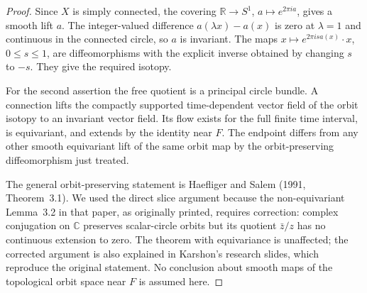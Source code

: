 \begin{proof}
Since \(X\) is simply connected, the covering
\(\mathbb R\to S^1\), \(a\mapsto e^{2\pi ia}\), gives a smooth
lift \(a\). The integer-valued difference
\(a(\lambda x)-a(x)\) is zero at \(\lambda=1\) and continuous
in the connected circle, so \(a\) is invariant. The maps
\(x\mapsto e^{2\pi isa(x)}\cdot x\), \(0\leq s\leq1\),
are diffeomorphisms with the explicit inverse obtained by changing
\(s\) to \(-s\). They give the required isotopy.

For the second assertion the free quotient is a principal circle
bundle. A connection lifts the compactly supported time-dependent
vector field of the orbit isotopy to an invariant vector field.
Its flow exists for the full finite time interval, is equivariant,
and extends by the identity near \(F\). The endpoint differs from
any other smooth equivariant lift of the same orbit map by the
orbit-preserving diffeomorphism just treated.

The general orbit-preserving statement is Haefliger and Salem
(1991, Theorem~3.1). We used the direct slice argument because the
non-equivariant Lemma~3.2 in that paper, as originally printed,
requires correction: complex conjugation on \(\mathbb C\)
preserves scalar-circle orbits but its quotient
\(\bar z/z\) has no continuous extension to zero. The theorem
with equivariance is unaffected; the corrected argument is also
explained in Karshon's research slides, which reproduce the original
statement. No conclusion about smooth maps of the topological orbit
space near \(F\) is assumed here.
\nocite{HaefligerSalem1991D,KarshonOrbitSlidesD}
\end{proof}

